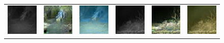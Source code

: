 \begin{figure}[htp!]
\begin{tabularx}{\textwidth}{Y Y Y !{\space} Y Y Y}
        \includegraphics{gfx/conditional-diffusion-sampling-caltech-qual/nir_5860ede3-23d2-11e8-a6a3-ec086b02610b.jpg} & \includegraphics{gfx/conditional-diffusion-sampling-caltech-qual/cyclegan_5860ede3-23d2-11e8-a6a3-ec086b02610b_fake.png} & \includegraphics{gfx/conditional-diffusion-sampling-caltech-qual/diffusion_5860ede3-23d2-11e8-a6a3-ec086b02610b.png} & \includegraphics{gfx/conditional-diffusion-sampling-caltech-qual/nir_586437e6-23d2-11e8-a6a3-ec086b02610b.jpg} & \includegraphics{gfx/conditional-diffusion-sampling-caltech-qual/cyclegan_586437e6-23d2-11e8-a6a3-ec086b02610b_fake.png} & \includegraphics{gfx/conditional-diffusion-sampling-caltech-qual/diffusion_586437e6-23d2-11e8-a6a3-ec086b02610b.png}
    \end{tabularx}
    \caption{
    }
    \label{fig:qualitative-evaluation-conditional-sampling-caltech}
\end{figure}

